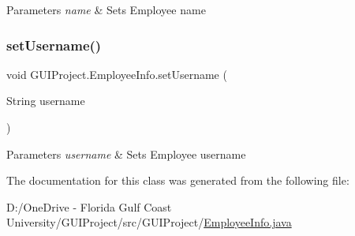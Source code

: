 \begin{DoxyParams}{Parameters}
{\em name} & Sets Employee name \\
\hline
\end{DoxyParams}
\mbox{\label{class_g_u_i_project_1_1_employee_info_a8b4c4c3e85910d492f57743fd982660d}} 
\subsubsection{\texorpdfstring{setUsername()}{setUsername()}}
{\footnotesize\ttfamily void G\+U\+I\+Project.\+Employee\+Info.\+set\+Username (\begin{DoxyParamCaption}\item[{String}]{username }\end{DoxyParamCaption})}


\begin{DoxyParams}{Parameters}
{\em username} & Sets Employee username \\
\hline
\end{DoxyParams}


The documentation for this class was generated from the following file\+:\begin{DoxyCompactItemize}
\item 
D\+:/\+One\+Drive -\/ Florida Gulf Coast University/\+G\+U\+I\+Project/src/\+G\+U\+I\+Project/\mbox{\hyperlink{_employee_info_8java}{Employee\+Info.\+java}}\end{DoxyCompactItemize}
